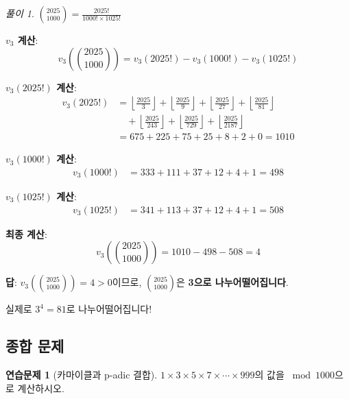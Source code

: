 \documentclass[11pt,a4paper]{article}
\theoremstyle{definition}
\newtheorem{exercise}{연습문제}[section]
\theoremstyle{remark}
\newtheorem*{solution}{풀이}
\begin{document}
\begin{solution}

$\displaystyle\binom{2025}{1000} = \frac{2025!}{1000! \times 1025!}$

\textbf{$v_3$ 계산}:
\[v_3\left(\binom{2025}{1000}\right) = v_3(2025!) - v_3(1000!) - v_3(1025!)\]

\textbf{$v_3(2025!)$ 계산}:
\begin{align*}
v_3(2025!) &= \left\lfloor \frac{2025}{3} \right\rfloor + \left\lfloor \frac{2025}{9} \right\rfloor + \left\lfloor \frac{2025}{27} \right\rfloor + \left\lfloor \frac{2025}{81} \right\rfloor \\
&\quad + \left\lfloor \frac{2025}{243} \right\rfloor + \left\lfloor \frac{2025}{729} \right\rfloor + \left\lfloor \frac{2025}{2187} \right\rfloor \\
&= 675 + 225 + 75 + 25 + 8 + 2 + 0 = 1010
\end{align*}

\textbf{$v_3(1000!)$ 계산}:
\begin{align*}
v_3(1000!) &= 333 + 111 + 37 + 12 + 4 + 1 = 498
\end{align*}

\textbf{$v_3(1025!)$ 계산}:
\begin{align*}
v_3(1025!) &= 341 + 113 + 37 + 12 + 4 + 1 = 508
\end{align*}

\textbf{최종 계산}:
\[v_3\left(\binom{2025}{1000}\right) = 1010 - 498 - 508 = 4\]

\textbf{답}: $v_3\left(\binom{2025}{1000}\right) = 4 > 0$이므로, $\binom{2025}{1000}$은 \textbf{3으로 나누어떨어집니다}.

실제로 $3^4 = 81$로 나누어떨어집니다!
\end{solution}

\subsection{종합 문제}

\begin{exercise}[카마이클과 p-adic 결합]
$1 \times 3 \times 5 \times 7 \times \cdots \times 999$의 값을 $\bmod 1000$으로 계산하시오.
\end{exercise}
\end{document}
